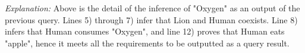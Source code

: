 \textit{Explanation:} Above is the detail of the inference of "Oxygen" as an output of the previous query. Lines 5) through 7) infer that Lion and Human coexists. Line 8) infers that Human consumes "Oxygen", and line 12) proves that Human eats "apple", hence it meets all the requirements to be outputted as a query result.